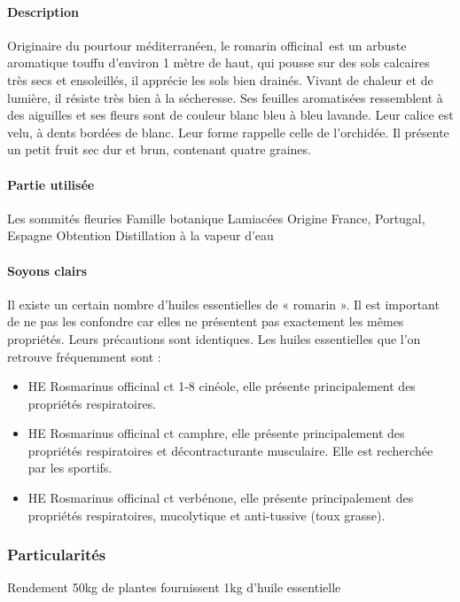 \documentclass[12pt,a4wide]{article}
\begin{document}
\paragraph{Description}
\label{sec-4-10-2-1}

Originaire du pourtour méditerranéen, le romarin officinal est un arbuste aromatique touffu d'environ 1 mètre de haut, qui pousse sur des sols calcaires très secs et ensoleillés, il apprécie les sols bien drainés. Vivant de chaleur et de lumière, il résiste très bien à la sécheresse. Ses feuilles aromatisées ressemblent à des aiguilles et ses fleurs sont de couleur blanc bleu à bleu lavande. Leur calice est velu, à dents bordées de blanc. Leur forme rappelle celle de l'orchidée. Il présente un petit fruit sec dur et brun, contenant quatre graines.

\paragraph{Partie utilisée}
\label{sec-4-10-2-2}
Les sommités fleuries
Famille botanique
Lamiacées
Origine
France, Portugal, Espagne
Obtention
Distillation à la vapeur d'eau

\paragraph{Soyons clairs}
\label{sec-4-10-2-3}

Il existe un certain nombre d'huiles essentielles de « romarin ». Il est important de ne pas les confondre car elles ne présentent pas exactement les mêmes propriétés.
Leurs précautions sont identiques.
Les huiles essentielles que l'on retrouve fréquemment sont :
\begin{itemize}
\item HE Rosmarinus officinal ct 1-8 cinéole, elle présente principalement des propriétés respiratoires.
\item HE Rosmarinus officinal ct camphre, elle présente principalement des propriétés respiratoires et décontracturante musculaire. Elle est recherchée par les sportifs.
\item HE Rosmarinus officinal ct verbénone, elle présente principalement des propriétés respiratoires, mucolytique et anti-tussive (toux grasse).
\end{itemize}



\subsubsection{Particularités}
\label{sec-4-10-3}
Rendement
50kg de plantes fournissent 1kg d'huile essentielle
\end{document}
